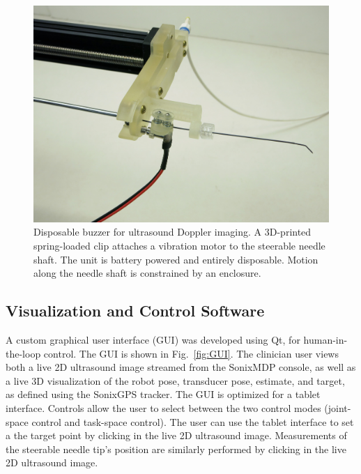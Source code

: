 \begin{figure}[!t]
\centering
\includegraphics[width = 0.8\columnwidth]{./Images/Chapter5/Buzzer/Buzzer.jpg}%
\caption[Disposable buzzer]{Disposable buzzer for ultrasound Doppler imaging. A 3D-printed spring-loaded clip attaches a vibration motor to the steerable needle shaft. The unit is battery powered and entirely disposable. Motion along the needle shaft is constrained by an enclosure.}
\label{fig:Buzzer}
\end{figure}  

\subsection{Visualization and Control Software}
A custom graphical user interface (GUI) was developed using Qt, for human-in-the-loop control. The GUI is shown in Fig.~\ref{fig:GUI}. The clinician user views both a live 2D ultrasound image streamed from the SonixMDP console, as well as a live 3D visualization of the robot pose, transducer pose, estimate, and target, as defined using the SonixGPS tracker. The GUI is optimized for a tablet interface. Controls allow the user to select between the two control modes (joint-space control and task-space control). The user can use the tablet interface to set a the target point by clicking in the live 2D ultrasound image. Measurements of the steerable needle tip's position are similarly performed by clicking in the live 2D ultrasound image. 

